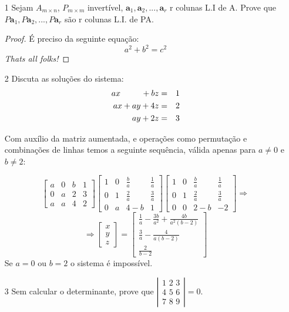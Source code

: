 \documentclass[11pt]{article}
\begin{document}
\begin{itemize}
\item[1] Sejam $A_{m \times n}$, $P_{m \times m}$ invertível, $\textbf{a}_1, \textbf{a}_2, ..., \textbf{a}_r$ r colunas L.I de A. Prove que $P\textbf{a}_1,P\textbf{a}_2,...,P\textbf{a}_r$ são r colunas L.I. de PA.
\begin{proof}
É preciso da seguinte equação:
\[
a^2 + b^2 = c^2
\]
\textit{Thats all folks!} \qedhere
\end{proof}

\item[2] Discuta as soluções do sistema:
\begin{eqnarray*} 
ax \hspace{9mm} +bz &=&1\\
ax+ay+4z&=&2\\
ay+2z&=&3 
\end{eqnarray*}

Com auxílio da matriz aumentada, e operações como permutação e combinações de linhas temos a seguinte sequência, válida apenas para $a\neq0$ e $b\neq2$:

$$
\begin{bmatrix}
a&0&b&1\\0&a&2&3\\a&a&4&2
\end{bmatrix}
\begin{bmatrix}
1&0&\frac{b}{a}&\frac{1}{a}\\0&1&\frac{2}{a}&\frac{3}{a}\\0&a&4-b&1
\end{bmatrix}
\begin{bmatrix}
1&0&\frac{b}{a}&\frac{1}{a}\\0&1&\frac{2}{a}&\frac{3}{a}\\0&0&2-b&-2
\end{bmatrix}
\Rightarrow
$$
$$
\Rightarrow
\begin{bmatrix}
x\\y\\z
\end{bmatrix}
=
\begin{bmatrix}
\frac{1}{a}-\frac{3b}{a^2} + \frac{4b}{a^2(b-2)}\\\frac{3}{a}-\frac{4}{a(b-2)}\\\frac{2}{b-2}
\end{bmatrix}
$$
Se $a=0$ ou $b=2$ o sistema é impossível.

\item[3] Sem calcular o determinante, prove que 
$ \left \vert
\begin{array}{lll}
\displaystyle \text{1 2 3} \\
\displaystyle \text{4 5 6} \\
\displaystyle \text{7 8 9}
\end{array}
\right \vert = 0.
$


\end{itemize}
\end{document}
